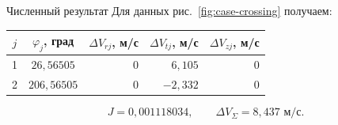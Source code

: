 \begin{explanation}{Численный результат}
Для данных рис.~\ref{fig:case-crossing} получаем:
\begin{center}\begin{tabular}{cc|rrr}
$j$ & $\varphi_j$, град & $\Delta V_{rj}$, м/с & $\Delta V_{tj}$, м/с & $\Delta V_{zj}$, м/с\\\hline
1 & $26{,}56505$ & $0$ & $6{,}105$ & $0$\\
2 & $206{,}56505$ & $0$ & $-2{,}332$ & $0$\\
\end{tabular}\end{center}
\[ J=0{,}001118034,\qquad \Delta V_\Sigma=8{,}437\text{ м/с}.\]
\end{explanation}
